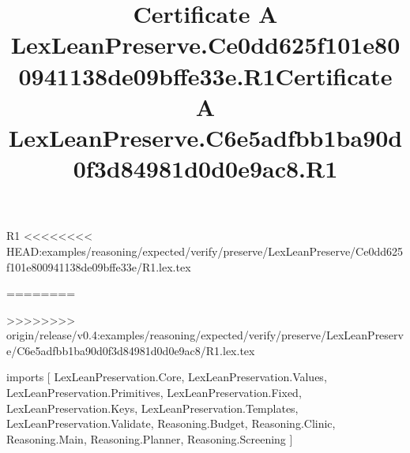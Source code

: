 \begin{lexlean}{R1}
<<<<<<<< HEAD:examples/reasoning/expected/verify/preserve/LexLeanPreserve/Ce0dd625f101e800941138de09bffe33e/R1.lex.tex
\title{Certificate A LexLeanPreserve.Ce0dd625f101e800941138de09bffe33e.R1}
========
\title{Certificate A LexLeanPreserve.C6e5adfbb1ba90d0f3d84981d0d0e9ac8.R1}
>>>>>>>> origin/release/v0.4:examples/reasoning/expected/verify/preserve/LexLeanPreserve/C6e5adfbb1ba90d0f3d84981d0d0e9ac8/R1.lex.tex
\begin{coremodule}
imports [
  LexLeanPreservation.Core,
  LexLeanPreservation.Values,
  LexLeanPreservation.Primitives,
  LexLeanPreservation.Fixed,
  LexLeanPreservation.Keys,
  LexLeanPreservation.Templates,
  LexLeanPreservation.Validate,
  Reasoning.Budget,
  Reasoning.Clinic,
  Reasoning.Main,
  Reasoning.Planner,
  Reasoning.Screening
]


\end{coremodule}
\end{lexlean}
